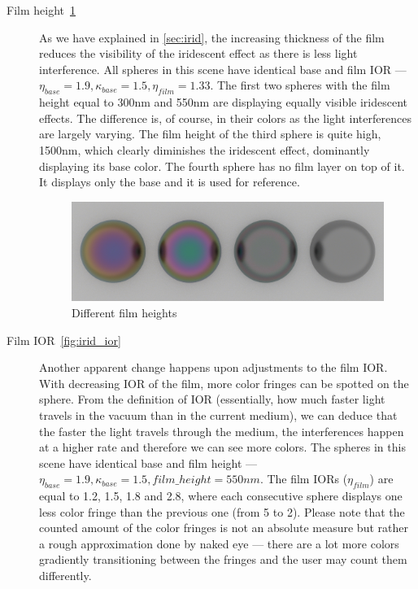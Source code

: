 \begin{description}
	\item[Film height~\ref{fig:irid_height}] As we have explained in \autoref{sec:irid}, the increasing thickness of the film reduces the visibility of the iridescent effect as there is less light interference. All spheres in this scene have identical base and film IOR --- $\eta_{base}=1.9, \kappa_{base}=1.5, \eta_{film}=1.33$. The first two spheres with the film height equal to 300nm and 550nm are displaying equally visible iridescent effects. The difference is, of course, in their colors as the light interferences are largely varying. The film height of the third sphere is quite high, 1500nm, which clearly diminishes the iridescent effect, dominantly displaying its base color. The fourth sphere has no film layer on top of it. It displays only the base and it is used for reference.
	\begin{figure}[H]
		\centering
		\includegraphics[width=.9\linewidth]{img/iridescent_spheres_height.png}
		\caption{Different film heights}
		\label{fig:irid_height}
	\end{figure}
	\item[Film IOR~\ref{fig:irid_ior}] Another apparent change happens upon adjustments to the film IOR. With decreasing IOR of the film, more color fringes can be spotted on the sphere. From the definition of IOR (essentially, how much faster light travels in the vacuum than in the current medium), we can deduce that the faster the light travels through the medium, the interferences happen at a higher rate and therefore we can see more colors. The spheres in this scene have identical base and film height --- $\eta_{base}=1.9, \kappa_{base}=1.5, film\_height=550nm$. The film IORs ($\eta_{film}$) are equal to 1.2, 1.5, 1.8 and 2.8, where each consecutive sphere displays one less color fringe than the previous one (from 5 to 2). Please note that the counted amount of the color fringes is not an absolute measure but rather a rough approximation done by naked eye --- there are a lot more colors gradiently transitioning between the fringes and the user may count them differently.
	\begin{figure}[H]

\end{figure}
\end{description}
